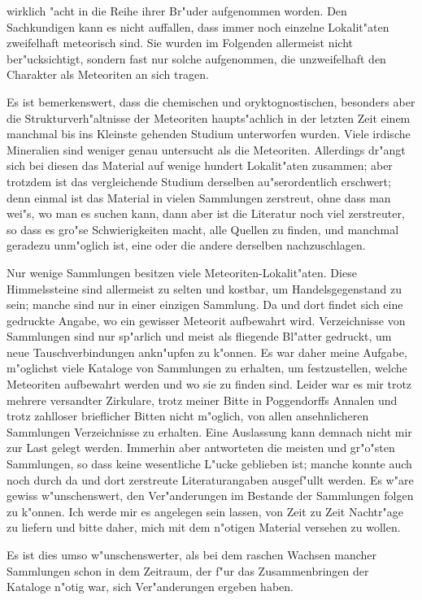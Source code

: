\documentclass[a4paper, 11pt, oneside]{article}
\begin{document}
wirklich "acht in die Reihe ihrer Br"uder aufgenommen worden. Den Sachkundigen kann es nicht auffallen, dass immer noch einzelne Lokalit"aten zweifelhaft meteorisch sind. Sie wurden im Folgenden allermeist nicht ber"ucksichtigt, sondern fast nur solche aufgenommen, die unzweifelhaft den Charakter als Meteoriten an sich tragen.

Es ist bemerkenswert, dass die chemischen und oryktognostischen, besonders aber die Strukturverh"altnisse der Meteoriten haupts"achlich in der letzten Zeit einem manchmal bis ins Kleinste gehenden Studium unterworfen wurden. Viele irdische Mineralien sind weniger genau untersucht als die Meteoriten. Allerdings dr"angt sich bei diesen das Material auf wenige hundert Lokalit"aten zusammen; aber trotzdem ist das vergleichende Studium derselben au"serordentlich erschwert; denn einmal ist das Material in vielen Sammlungen zerstreut, ohne dass man wei"s, wo man es suchen kann, dann aber ist die Literatur noch viel zerstreuter, so dass es gro"se Schwierigkeiten macht, alle Quellen zu finden, und manchmal geradezu unm"oglich ist, eine oder die andere derselben nachzuschlagen.

Nur wenige Sammlungen besitzen viele Meteoriten-Lokalit"aten. Diese Himmelssteine sind allermeist zu selten und kostbar, um Handelsgegenstand zu sein; manche sind nur in einer einzigen Sammlung. Da und dort findet sich eine gedruckte Angabe, wo ein gewisser Meteorit aufbewahrt wird. Verzeichnisse von Sammlungen sind nur sp"arlich und meist als fliegende Bl"atter gedruckt, um neue Tauschverbindungen ankn"upfen zu k"onnen. Es war daher meine Aufgabe, m"oglichst viele Kataloge von Sammlungen zu erhalten, um festzustellen, welche Meteoriten aufbewahrt werden und wo sie zu finden sind. Leider war es mir trotz mehrere versandter Zirkulare, trotz meiner Bitte in Poggendorffs Annalen und trotz zahlloser brieflicher Bitten nicht m"oglich, von allen ansehnlicheren Sammlungen Verzeichnisse zu erhalten. Eine Auslassung kann demnach nicht mir zur Last gelegt werden. Immerhin aber antworteten die meisten und gr"o"sten Sammlungen, so dass keine wesentliche L"ucke geblieben ist; manche konnte auch noch durch da und dort zerstreute Literaturangaben ausgef"ullt werden. Es w"are gewiss w"unschenswert, den Ver"anderungen im Bestande der Sammlungen folgen zu k"onnen. Ich werde mir es angelegen sein lassen, von Zeit zu Zeit Nachtr"age zu liefern und bitte daher, mich mit dem n"otigen Material versehen zu wollen.

Es ist dies umso w"unschenswerter, als bei dem raschen Wachsen mancher Sammlungen schon in dem Zeitraum, der f"ur das Zusammenbringen der Kataloge n"otig war, sich Ver"anderungen ergeben haben.
\end{document}
